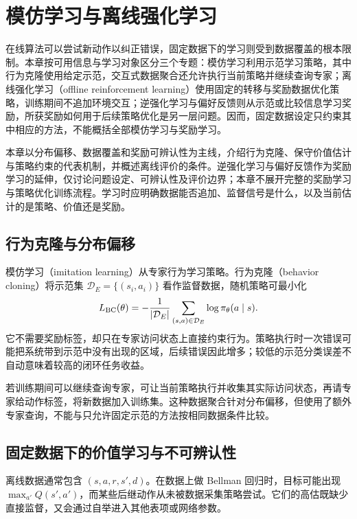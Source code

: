 \setcounter{chapter}{21} %
\chapter{模仿学习与离线强化学习}
\label{ch:rl-offline}

在线算法可以尝试新动作以纠正错误，固定数据下的学习则受到数据覆盖的根本限制。本章按可用信息与学习对象区分三个专题：模仿学习利用示范学习策略，其中行为克隆使用给定示范，交互式数据聚合还允许执行当前策略并继续查询专家；离线强化学习（offline reinforcement learning）使用固定的转移与奖励数据优化策略，训练期间不追加环境交互\cite{levine-offline}；逆强化学习与偏好反馈则从示范或比较信息学习奖励，所获奖励如何用于后续策略优化是另一层问题。因而，固定数据设定只约束其中相应的方法，不能概括全部模仿学习与奖励学习。

本章以分布偏移、数据覆盖和奖励可辨认性为主线，介绍行为克隆、保守价值估计与策略约束的代表机制，并概述离线评价的条件。逆强化学习与偏好反馈作为奖励学习的延伸，仅讨论问题设定、可辨认性及评价边界；本章不展开完整的奖励学习与策略优化训练流程。学习时应明确数据能否追加、监督信号是什么，以及当前估计的是策略、价值还是奖励。

\section{行为克隆与分布偏移}

模仿学习（imitation learning）从专家行为学习策略。行为克隆（behavior cloning）将示范集 $\mathcal D_E=\{(s_i,a_i)\}$ 看作监督数据，随机策略可最小化
\[
L_{\rm BC}(\theta)=-\frac1{|\mathcal D_E|}\sum_{(s,a)\in\mathcal D_E}\log\pi_\theta(a\mid s).
\]
它不需要奖励标签，却只在专家访问状态上直接约束行为。策略执行时一次错误可能把系统带到示范中没有出现的区域，后续错误因此增多；较低的示范分类误差不自动意味着较高的闭环任务收益。

若训练期间可以继续查询专家，可让当前策略执行并收集其实际访问状态，再请专家给动作标签，将新数据加入训练集。这种数据聚合针对分布偏移，但使用了额外专家查询，不能与只允许固定示范的方法按相同数据条件比较。

\section{固定数据下的价值学习与不可辨认性}

离线数据通常包含 $(s,a,r,s',d)$。在数据上做 Bellman 回归时，目标可能出现 $\max_{a'}Q(s',a')$，而某些后继动作从未被数据采集策略尝试。它们的高估既缺少直接监督，又会通过自举进入其他表项或网络参数。

